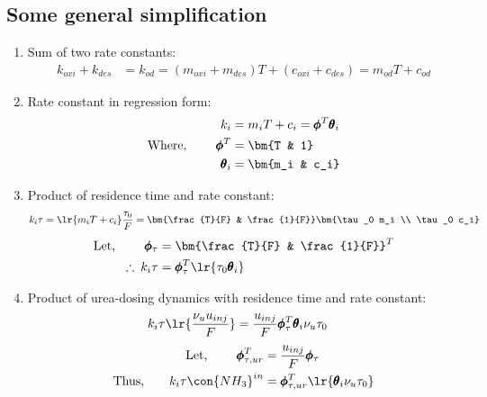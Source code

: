 \subsection{Some general simplification}
\begin{enumerate}
        \item Sum of two rate constants:
        \begin{align}
                k_{oxi} + k_{des} &= k_{od} = (m_{oxi} + m_{des}) T + (c_{oxi} + c_{des}) = m_{od} T + c_{od} \label{eqn::k_sum}
        \end{align}

        \item Rate constant in regression form:
        \begin{align}
                k_i &= m_i T + c_i = \pmb \phi^T \pmb \theta_i\\
                \text{Where, } \qquad \pmb \phi^T &= \bm{T & 1}       \label{eqn::phi_i}\\
                                      \pmb \theta_i &= \bm{m_i & c_i} \label{eqn::theta_i}
        \end{align}

        \item Product of residence time and rate constant:
        \begin{align*}
        k_i \tau  = \lr{m_i T + c_i} \frac{\tau_0}{F} = \bm{\frac{T}{F} & \frac{1}{F}} \bm{\tau_0 m_i \\ \tau_0 c_i}
        \end{align*}
        \begin{align}
                \text{Let, } \qquad \pmb \phi_\tau &= \bm{\frac{T}{F} & \frac{1}{F}}^T  \label{eqn::phi_tau}\\
                \therefore \: k_i \tau &= \pmb \phi_\tau^T \lr{\tau_0 \pmb \theta_i}   \label{eqn::tau_ki}
        \end{align}


        \item Product of urea-dosing dynamics with residence time and rate constant:
        \begin{align*}
        k_{i} \tau \lr{\frac{\nu_u u_{inj}}{F}} &= \frac{u_{inj}}{F} \pmb \phi_\tau^T \pmb \theta_i \nu_u \tau_0
        \end{align*}
        \begin{align}
        \text{Let, } \qquad \pmb\phi_{\tau,ur}^T &= \frac{u_{inj}}{F}  \pmb \phi_\tau \\
        \text{Thus,} \qquad k_i \tau \con{NH_3}^{in} &= \pmb \phi_{\tau, ur}^T \lr{\pmb \theta_{i} \nu_u \tau_0}   \label{eqn::k_tau_urea}
        \end{align}


\end{enumerate}
